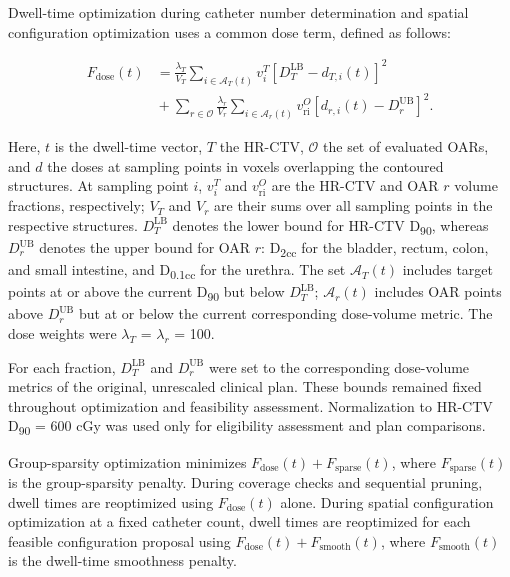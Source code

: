\documentclass[12pt,twoside,letterpaper]{article}
\begin{document}
Dwell-time optimization during catheter number determination and spatial configuration optimization uses a common dose term, defined as follows:

\begin{equation}\label{eq:1}
\begin{aligned}F_{\text{dose}}\left( t \right) &= \frac{\lambda_{T}}{V_{T}}\sum_{i \in \mathcal{A}_{T}\left( t \right)}^{}{v_{i}^{T}\left\lbrack D_{T}^{\text{LB}} - d_{T,i}(t) \right\rbrack^{2}}\\ &{}+\sum_{r \in \mathcal{O}}^{}{\frac{\lambda_{r}}{V_{r}}\sum_{i \in \mathcal{A}_{r}\left( t \right)}^{}{v_{\text{ri}}^{O}\left\lbrack d_{r,i}\left( t \right) - D_{r}^{\text{UB}} \right\rbrack^{2}}}.\end{aligned}
\end{equation}

Here, $t$ is the dwell-time vector, $T$ the HR-CTV, $\mathcal{O}$ the set of evaluated OARs, and $d$ the doses at sampling points in voxels overlapping the contoured structures. At sampling point $i$, $v_{i}^{T}$ and $v_{\text{ri}}^{O}$ are the HR-CTV and OAR $r$ volume fractions, respectively; $V_{T}$ and $V_{r}$ are their sums over all sampling points in the respective structures. $D_{T}^{\text{LB}}$ denotes the lower bound for HR-CTV D\textsubscript{90}, whereas $D_{r}^{\text{UB}}$ denotes the upper bound for OAR $r$: D\textsubscript{2cc} for the bladder, rectum, colon, and small intestine, and D\textsubscript{0.1cc} for the urethra. The set $\mathcal{A}_{T}\left( t \right)$ includes target points at or above the current D\textsubscript{90} but below $D_{T}^{\text{LB}}$; $\mathcal{A}_{r}\left( t \right)$ includes OAR points above $D_{r}^{\text{UB}}$ but at or below the current corresponding dose-volume metric. The dose weights were $\lambda_{T}$ = $\lambda_{r}$ = 100.

For each fraction, $D_{T}^{\text{LB}}$ and $D_{r}^{\text{UB}}$ were set to the corresponding dose-volume metrics of the original, unrescaled clinical plan. These bounds remained fixed throughout optimization and feasibility assessment. Normalization to HR-CTV D\textsubscript{90} = 600 cGy was used only for eligibility assessment and plan comparisons.

Group-sparsity optimization minimizes $F_{\text{dose}}\left( t \right) + F_{\text{sparse}}\left( t \right)$, where $F_{\text{sparse}}\left( t \right)$ is the group-sparsity penalty. During coverage checks and sequential pruning, dwell times are reoptimized using $F_{\text{dose}}\left( t \right)$ alone. During spatial configuration optimization at a fixed catheter count, dwell times are reoptimized for each feasible configuration proposal using $F_{\text{dose}}\left( t \right) + F_{\text{smooth}}\left( t \right)$, where $F_{\text{smooth}}\left( t \right)$ is the dwell-time smoothness penalty.
\end{document}

